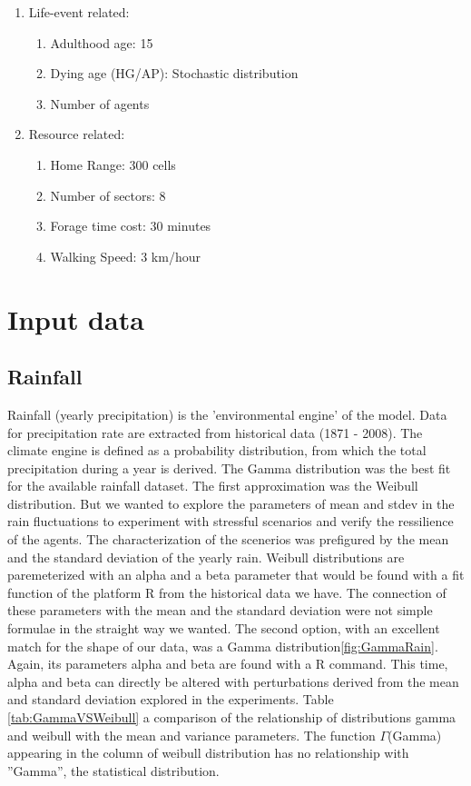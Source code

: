 \documentclass[11pt,oneside,a4paper,openright]{report}
\begin{document}
\begin{enumerate}
	\item Life-event related:
	\begin{enumerate}
		\item Adulthood age: 15
		\item Dying age (HG/AP): Stochastic distribution %
		\item Number of agents 
	\end{enumerate}
	\item Resource related:
	\begin{enumerate}
		\item Home Range: 300 cells
		\item Number of sectors: 8
		\item Forage time cost: 30 minutes
		\item Walking Speed: 3 km/hour
	\end{enumerate}
\end{enumerate}


\section{Input data}

\subsection{Rainfall}

Rainfall (yearly precipitation) is the 'environmental engine' of the model. Data for precipitation rate are
extracted from historical data (1871 - 2008). The climate engine is defined as a probability distribution,
from which the total precipitation during a year is derived. The Gamma distribution was the best fit for
the available rainfall dataset. The first approximation was the Weibull distribution. But we wanted to explore
the parameters of mean and stdev in the rain fluctuations to experiment with stressful scenarios and verify
the ressilience of the agents. The characterization of the scenerios was prefigured by the mean and the 
standard deviation of the yearly rain. Weibull distributions are paremeterized with an alpha and a beta 
parameter that would be found with a fit function of the platform R from the historical data we have. The connection
of these parameters with the mean and the standard deviation were not simple formulae in the straight way we wanted. 
The second option, with an excellent match for the shape of our data, was a Gamma distribution\ref{fig:GammaRain}. Again, its parameters alpha and beta are found with a R command. This time, alpha and beta can directly be altered with perturbations derived from the mean and standard deviation explored in the experiments. Table \ref{tab:GammaVSWeibull} a comparison of the relationship of distributions gamma and weibull with the mean and variance parameters.
The function $\Gamma$(Gamma) appearing in the column of weibull distribution has no relationship with ''Gamma'', the statistical distribution. 
\end{document}
